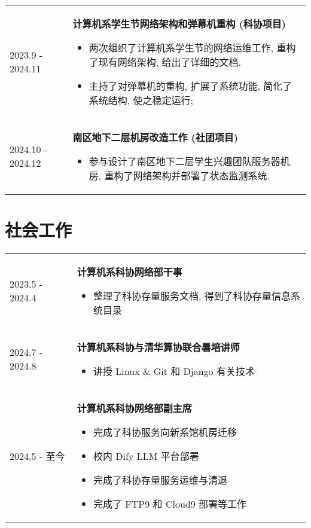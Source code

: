 \documentclass[a4paper, 10pt]{article}
\begin{document}
\begin{tabular}{p{}p{}}
        2023.9 - 2024.11 & \textbf{计算机系学生节网络架构和弹幕机重构 (科协项目)}
        \fontsize{8pt}{10pt}\selectfont \begin{itemize}[left=0pt,topsep=0pt,partopsep=0pt,parsep=0pt,itemsep=0pt]
            \item 两次组织了计算机系学生节的网络运维工作, 重构了现有网络架构, 给出了详细的文档.
            \item 主持了对弹幕机的重构, 扩展了系统功能, 简化了系统结构, 使之稳定运行;
        \end{itemize} \\

        2024.10 - 2024.12 & \textbf{南区地下二层机房改造工作 (社团项目)}
        \fontsize{8pt}{10pt}\selectfont \begin{itemize}[left=0pt,topsep=0pt,partopsep=0pt,parsep=0pt,itemsep=0pt]
            \item 参与设计了南区地下二层学生兴趣团队服务器机房, 重构了网络架构并部署了状态监测系统.
        \end{itemize}
\end{tabular}

\section*{社会工作}
\noindent
\begin{tabular}{p{}p{}}
    2023.5 - 2024.4 & \textbf{计算机系科协网络部干事}
        \fontsize{8pt}{10pt}\selectfont
        \begin{itemize}[left=0pt,topsep=0pt,partopsep=0pt,parsep=0pt,itemsep=0pt]
            \item 整理了科协存量服务文档, 得到了科协存量信息系统目录
        \end{itemize} \\

    2024.7 - 2024.8 & \textbf{计算机系科协与清华算协联合暑培讲师}
        \fontsize{8pt}{10pt}\selectfont
        \begin{itemize}[left=0pt,topsep=0pt,partopsep=0pt,parsep=0pt,itemsep=0pt]
            \item 讲授 Linux \& Git 和 Django 有关技术
        \end{itemize} \\

    2024.5 - 至今 & \textbf{计算机系科协网络部副主席}
        \fontsize{8pt}{10pt}\selectfont
        \begin{itemize}[left=0pt,topsep=0pt,partopsep=0pt,parsep=0pt,itemsep=0pt]
            \item 完成了科协服务向新系馆机房迁移
            \item 校内 Dify LLM 平台部署
            \item 完成了科协存量服务运维与清退
            \item 完成了 FTP9 和 Cloud9 部署等工作
        \end{itemize}
\end{tabular}
\end{document}
